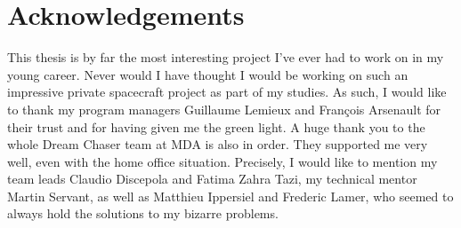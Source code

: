 \chapter*{Acknowledgements}\label{cha:ack}
This thesis is by far the most interesting project I've ever had to work on in my young career. Never would I have thought I would be working on such an impressive private spacecraft project as part of my studies. As such, I would like to thank my program managers Guillaume Lemieux and François Arsenault for their trust and for having given me the green light. A huge thank you to the whole Dream Chaser team at MDA is also in order. They supported me very well, even with the home office situation. Precisely, I would like to mention my team leads Claudio Discepola and Fatima Zahra Tazi, my technical mentor Martin Servant, as well as Matthieu Ippersiel and Frederic Lamer, who seemed to always hold the solutions to my bizarre problems.